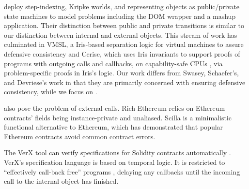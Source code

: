 \citet{dd} deploy step-indexing, Kripke worlds, and representing objects
as public/private state machines to model problems including the 
DOM wrapper and a mashup application.
Their distinction between public and private transitions %
is similar  to our
distinction between internal and external objects.
This stream of work has culminated in VMSL, a Iris-based separation logic for
virtual machines to assure defensive consistency
\cite{vmsl-pldi2023}
%
%
and Cerise, which uses Iris invariants to support proofs of programs with outgoing calls and callbacks,
on capability-safe CPUs \cite{cerise-jacm2024},
via problem-specific proofs in Iris's logic.
Our work differs from Swasey, Schaefer's, and Devriese's work in that
they are primarily concerned   with  ensuring defensive consistency, 
while we focus on .

 also pose the problem of external calls.
Rich-Ethereum \cite{rich-specs-smart-contracts-oopsla2021}
relies on Ethereum contracts' fields being instance-private
and unaliased. %
Scilla \cite{sergey-scilla-oopsla2019}
is a minimalistic functional alternative to Ethereum,
which has demonstrated that popular Ethereum
contracts avoid common contract errors.
%


The VerX tool can verify
specifications for Solidity contracts automatically \cite{VerX}.
VerX's specification language is based on temporal logic.
It %
is restricted to ``effectively call-back free'' programs
\cite{Grossman,relaxed-callbacks-ToDES},
delaying any callbacks until the
incoming call to the internal object has finished.
 
